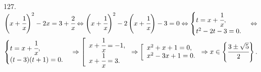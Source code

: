 127. $\left(x+\cfrac{1}{x}\right)^2-2x=3+\cfrac{2}{x}\Leftrightarrow \left(x+\cfrac{1}{x}\right)^2-2\left(x+\cfrac{1}{x}\right)-3=0\Leftrightarrow
\begin{cases} t=x+\cfrac{1}{x},\\ t^2-2t-3=0.\end{cases}\Leftrightarrow$\\$
\begin{cases} t=x+\cfrac{1}{x},\\ (t-3)(t+1)=0.\end{cases}\Rightarrow \left[\begin{array}{l} x+\cfrac{1}{x}=-1,\\ x+\cfrac{1}{x}=3.\end{array}\right.
\Rightarrow \left[\begin{array}{l} x^2+x+1=0,\\ x^2-3x+1=0.\end{array}\right.\Rightarrow x\in\left\{\cfrac{3\pm\sqrt{5}}{2}\right\}.$\\
